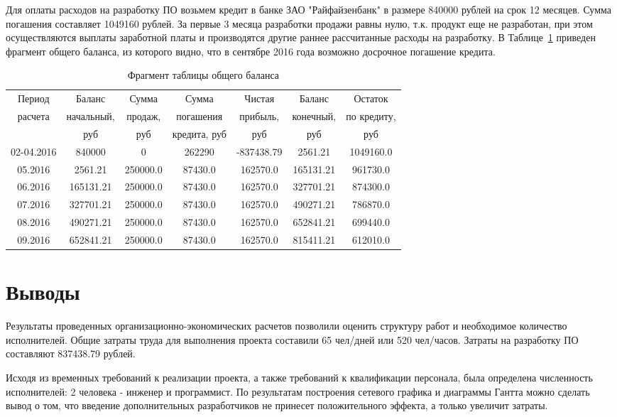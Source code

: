 Для оплаты расходов на разработку ПО возьмем кредит в банке ЗАО "Райфайзенбанк" в размере 840000 рублей на срок 12 месяцев. Сумма погашения составляет 1049160 рублей. За первые 3 месяца разработки продажи равны нулю, т.к. продукт еще не разработан, при этом осуществляются выплаты заработной платы и производятся другие раннее рассчитанные расходы на разработку. В Таблице~\ref{table:money_balance} приведен фрагмент общего баланса, из которого видно, что в сентябре 2016 года возможно досрочное погашение кредита.
\begin{table}
\caption{Фрагмент таблицы общего баланса}
\label{table:money_balance}
\begin{tabular} {| c | c | c | c | c | c | c |} 
\hline
Период & Баланс & Сумма & Сумма & Чистая & Баланс & Остаток\\
расчета & начальный, & продаж, & погашения & прибыль, & конечный, & по кредиту,\\
& руб & руб & кредита, руб & руб & руб & руб\\
\hline
02-04.2016 & 840000 & 0 & 262290 & -837438.79 & 2561.21 & 1049160.0\\
\hline
05.2016 & 2561.21 & 250000.0 & 87430.0 & 162570.0 & 165131.21 & 961730.0\\
\hline
06.2016 & 165131.21 & 250000.0 & 87430.0 & 162570.0 & 327701.21 & 874300.0\\
\hline
07.2016 & 327701.21 & 250000.0 & 87430.0 & 162570.0 & 490271.21 & 786870.0\\
\hline
08.2016 & 490271.21 & 250000.0 & 87430.0 & 162570.0 & 652841.21 & 699440.0\\
\hline
09.2016 & 652841.21 & 250000.0 & 87430.0 & 162570.0 & 815411.21 & 612010.0\\
\hline
\end{tabular}
\end{table}


\section{Выводы}
Результаты проведенных организационно-экономических расчетов позволили оценить структуру работ и необходимое количество исполнителей. Общие затраты труда для выполнения проекта составили 65 чел/дней или 520 чел/часов. Затраты на разработку ПО составляют 837438.79 рублей.

Исходя из временных требований к реализации проекта, а также требований к квалификации персонала, была определена численность исполнителей: 2 человека - инженер и программист. По результатам построения сетевого графика и диаграммы Гантта можно сделать вывод о том, что введение дополнительных разработчиков не принесет положительного эффекта, а только увеличит затраты.

